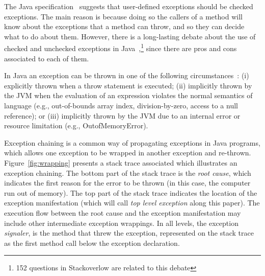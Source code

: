 \documentclass[conference]{IEEEtran}
\begin{document}
The Java specification~\cite{gosling2000java} suggests that user-defined
exceptions should be checked exceptions. The main reason is because doing so the
callers of a method will know about the exceptions that a method can throw, and
so they can decide what to do about them. However, there is a long-lasting
debate about the use of checked and unchecked exceptions in
Java~\cite{javatut,stackoverlow,debate},\footnote{152 questions in Stackoverlow
are related to this debate} since there are pros and cons associated to each of
them.


In Java an exception can be thrown in one of the following
circumstances~\cite{gosling2000java}: (i) explicitly thrown when a throw statement is executed; 
(ii) implicitly thrown by the JVM when the evaluation of an expression
 violates the normal semantics of language (e.g., out-of-bounds array index,
division-by-zero, access to a null reference); or (iii) implicitly thrown by
the JVM due to an internal error or resource limitation (e.g.,
OutofMemoryError). 




Exception chaining is a common way of propagating exceptions in Java programs, 
which allows one exception to be wrapped in another exception and re-thrown. 
Figure~\ref{fig:wrapping} presents a stack trace associated which illustrates an
exception chaining. The bottom part of the stack trace is the \emph{root cause}, which indicates the
first reason for the error to be thrown (in this case, the computer run out of
memory). The top part of the stack trace indicates the location of the exception
manifestation (which will call \emph{top level exception} along this paper). The
execution flow  between the root cause and the exception manifestation may
include other intermediate exception wrappings. In all levels, the exception
\emph{signaler}, is the method that threw the exception, represented on the
stack trace as the first method call below the exception declaration.
\end{document}
